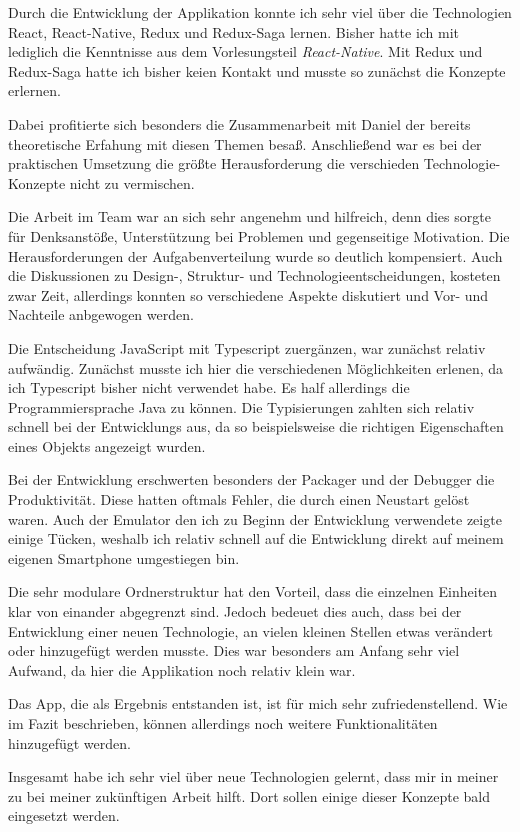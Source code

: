 Durch die Entwicklung der Applikation konnte ich sehr viel über die Technologien React, React-Native, Redux und Redux-Saga lernen.
Bisher hatte ich mit lediglich die Kenntnisse aus dem Vorlesungsteil \textit{React-Native}. Mit Redux und Redux-Saga hatte ich 
bisher keien Kontakt und musste so zunächst die Konzepte erlernen. 

Dabei profitierte sich besonders die Zusammenarbeit mit Daniel der bereits theoretische Erfahung mit diesen Themen besaß.
Anschließend war es bei der praktischen Umsetzung die größte Herausforderung die verschieden Technologie-Konzepte 
nicht zu vermischen. 

Die Arbeit im Team war an sich sehr angenehm und hilfreich, denn dies sorgte für Denksanstöße, Unterstützung bei Problemen und gegenseitige Motivation. 
Die Herausforderungen der Aufgabenverteilung wurde so deutlich kompensiert. 
Auch die Diskussionen zu Design-, Struktur- und Technologieentscheidungen, kosteten zwar Zeit, allerdings konnten so verschiedene Aspekte diskutiert und 
Vor- und Nachteile anbgewogen werden. 

Die Entscheidung JavaScript mit Typescript zuergänzen, war zunächst relativ aufwändig. Zunächst musste ich hier die verschiedenen Möglichkeiten erlenen,
 da ich Typescript bisher nicht verwendet habe. Es half allerdings die Programmiersprache Java zu können.  
Die Typisierungen zahlten sich relativ schnell bei der Entwicklungs aus, da so beispielsweise die richtigen Eigenschaften eines Objekts angezeigt wurden. 

Bei der Entwicklung erschwerten besonders der Packager und der Debugger die Produktivität. 
Diese hatten oftmals Fehler, die durch einen Neustart gelöst waren. Auch der Emulator den ich zu Beginn der Entwicklung 
verwendete zeigte einige Tücken, weshalb ich relativ schnell auf die Entwicklung direkt auf meinem eigenen Smartphone umgestiegen bin. 

Die sehr modulare Ordnerstruktur hat den Vorteil, dass die einzelnen Einheiten klar von einander abgegrenzt sind. 
Jedoch bedeuet dies auch, dass bei der Entwicklung einer neuen Technologie, an vielen kleinen Stellen etwas verändert oder
hinzugefügt werden musste. Dies war besonders am Anfang sehr viel Aufwand, da hier die Applikation noch relativ klein war. 

Das App, die als Ergebnis entstanden ist, ist für mich sehr zufriedenstellend. Wie im Fazit beschrieben, können allerdings 
noch weitere Funktionalitäten hinzugefügt werden. 

Insgesamt habe ich sehr viel über neue Technologien gelernt, dass mir in meiner zu bei meiner zukünftigen Arbeit hilft.
Dort sollen einige dieser Konzepte bald eingesetzt werden. 

